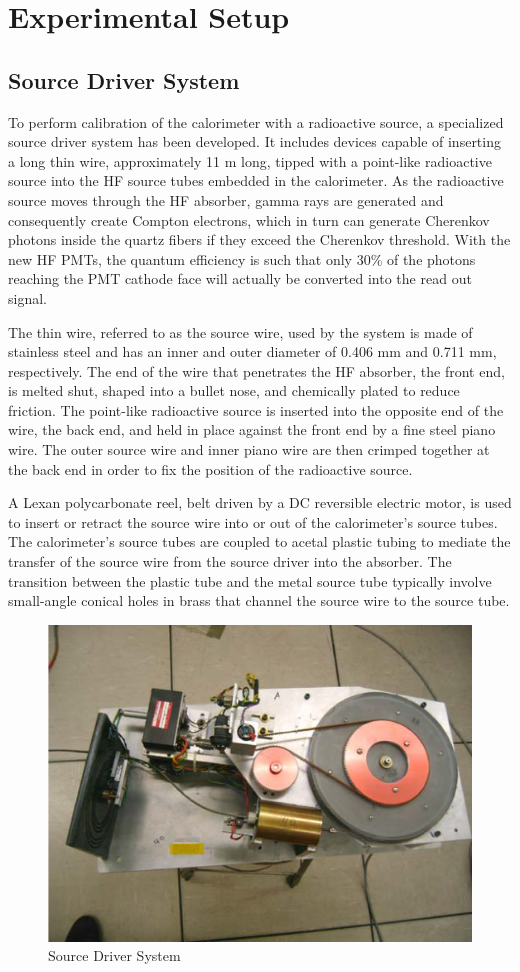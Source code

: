 \section{Experimental Setup}

\subsection{Source Driver System}
To perform calibration of the calorimeter with a radioactive source, a
specialized source driver system has been developed. It includes devices capable of inserting a long thin wire, approximately 11 m long, tipped with a point-like radioactive source into the HF source tubes embedded in the calorimeter. As the radioactive source moves through the HF absorber, gamma rays are generated and consequently create Compton electrons, which in turn can generate Cherenkov photons inside the quartz fibers if they exceed the Cherenkov threshold. With the new HF PMTs, the quantum efficiency is such that only 30\% of the photons reaching the PMT cathode face will actually be converted into the read out signal.

The thin wire, referred to as the source wire, used by the system is made of
stainless steel and has an inner and outer diameter of 0.406 mm and 0.711 mm,
respectively. The end of the wire that penetrates the HF absorber, the front end,
is melted shut, shaped into a bullet nose, and chemically plated to reduce friction. The point-like radioactive source is inserted into the opposite end of
the wire, the back end, and held in place against the front end by a fine steel
piano wire. The outer source wire and inner piano wire are then crimped together at the back end in order to fix the position of the radioactive source.

A Lexan polycarbonate reel, belt driven by a DC reversible electric motor, is used
to insert or retract the source wire into or out of the calorimeter's source tubes.
The calorimeter's source tubes are coupled to acetal plastic tubing to mediate the
transfer of the source wire from the source driver into the absorber. The
transition between the plastic tube and the metal source tube typically involve
small-angle conical holes in brass that channel the source wire to the source tube.

\begin{figure}[!h]
   \begin{center}
      \includegraphics[width=.5\textwidth]{figures/ch_hfcalibration/Source_Driver.png}
      \caption{Source Driver System}
      \label{fig:hf_expsetup_sourcedriver}
   \end{center}
\end{figure}

